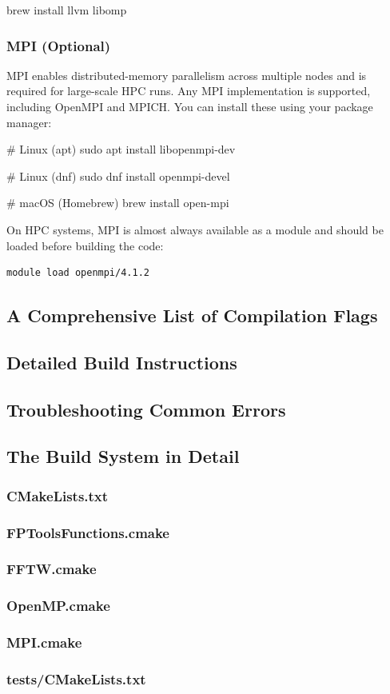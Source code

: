 \begin{bashcode}
brew install llvm libomp
\end{bashcode}

\subsubsection{MPI (Optional)}

MPI enables distributed-memory parallelism across multiple nodes and is required 
for large-scale HPC runs. Any MPI implementation is supported, including OpenMPI 
and MPICH. You can install these using your package manager:

\begin{bashcode}
# Linux (apt)
sudo apt install libopenmpi-dev

# Linux (dnf)  
sudo dnf install openmpi-devel

# macOS (Homebrew)
brew install open-mpi
\end{bashcode}

On HPC systems, MPI is almost always available as a module and should be loaded 
before building the code:

\begin{verbatim}
module load openmpi/4.1.2
\end{verbatim}

\subsection{A Comprehensive List of Compilation Flags}

\subsection{Detailed Build Instructions}

\subsection{Troubleshooting Common Errors}

\subsection{The Build System in Detail}

\subsubsection{CMakeLists.txt}
\subsubsection{FPToolsFunctions.cmake}
\subsubsection{FFTW.cmake}
\subsubsection{OpenMP.cmake}
\subsubsection{MPI.cmake}
\subsubsection{tests/CMakeLists.txt}
